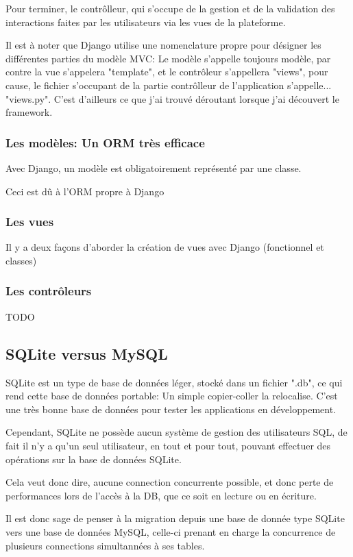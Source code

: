 \documentclass[12pt,table,a4paper]{report}
\begin{document}
Pour terminer, le contrôlleur, qui s'occupe de la gestion et de la validation des interactions faites par les utilisateurs via les vues de la plateforme.

Il est à noter que Django utilise une nomenclature propre pour désigner les différentes parties du modèle MVC: Le modèle s'appelle toujours modèle, par contre la vue s'appelera "template", et le contrôleur s'appellera "views", pour cause, le fichier s'occupant de la partie contrôlleur de l'application s'appelle... "views.py". C'est d'ailleurs ce que j'ai trouvé déroutant lorsque j'ai découvert le framework.

\subsubsection{Les modèles: Un ORM très efficace}
Avec Django, un modèle est obligatoirement représenté par une classe.

Ceci est dû à l'ORM propre à Django

\subsubsection{Les vues}
Il y a deux façons d'aborder la création de vues avec Django (fonctionnel et classes)

\subsubsection{Les contrôleurs}
TODO

\subsection{SQLite versus MySQL}
SQLite est un type de base de données léger, stocké dans un fichier ".db", ce qui rend cette base de données portable: Un simple copier-coller la relocalise. C'est une très bonne base de données pour tester les applications en développement.

Cependant, SQLite ne possède aucun système de gestion des utilisateurs SQL, de fait il n'y a qu'un seul utilisateur, en tout et pour tout, pouvant effectuer des opérations sur la base de données SQLite.

Cela veut donc dire, aucune connection concurrente possible, et donc perte de performances lors de l'accès à la DB, que ce soit en lecture ou en écriture.

Il est donc sage de penser à la migration depuis une base de donnée type SQLite vers une base de données MySQL, celle-ci prenant en charge la concurrence de plusieurs connections simultannées à ses tables.
\end{document}
